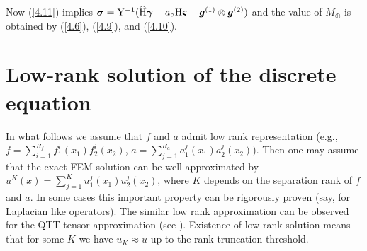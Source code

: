 \documentclass[amstex,amstext,amsfonts,epsf,12pt] {amsart}
\newcommand{\cred}{\color{red}}
\newcommand{\cn}{\color{black}}
\def\wh{\widehat}
\def\bgamma{\boldsymbol\gamma}
\def\bvarsigma{\boldsymbol\varsigma}
\def\bg{\boldsymbol g}
\begin{document}
Now (\ref{4.11}) implies
${\boldsymbol\sigma}={\rm Y}^{-1}(\wh {\rm H}\bgamma+a_\circ {\rm H}\bvarsigma-\bg^{(1)}\otimes \bg^{(2)})$
and the value of $M_\oplus$ is obtained by (\ref{4.6}), (\ref{4.9}), and (\ref{4.10}).




\color{black}
\section{Low-rank solution of the discrete equation}\label{sec:LowRank_Solut}

In what follows 
we assume that $f$ and $a$ admit low rank representation 
(e.g., $f=\sum_{i=1}^{R_f}f^i_1(x_1)f^i_2(x_2)$, $a=\sum_{j=1}^{R_a}a^j_1(x_1)a^j_2(x_2)$).
Then one may assume that the exact FEM solution can be well approximated by
$u^K(x)=\sum^K_{j=1} u^j_1(x_1) u^j_2(x_2)$,
where $K$ depends on the separation rank of $f$ and $a$. In some cases this important property
can be rigorously proven (say, for Laplacian like operators). The similar low rank
approximation can be observed for the QTT tensor approximation (see \cite{BokhSRep:15}). 
Existence of low rank solution means that for some $K$ we have $u_K\approx u$ up to
the rank truncation threshold.
\end{document}
